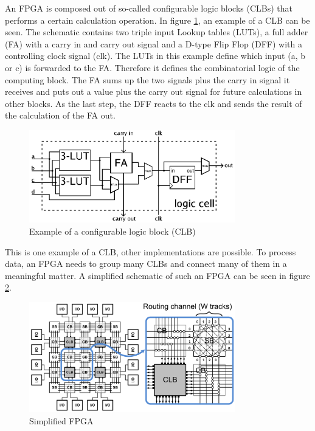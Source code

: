 An FPGA is composed out of so-called configurable logic blocks (CLBs)
that performs a certain calculation operation. In figure
\ref{fig:kallstrom_FPGA_cell_example}, an example of a CLB
can be seen. The schematic contains two triple input
Lookup tables (LUTs), a full adder (FA) with a carry in and
carry out signal and a D-type Flip Flop (DFF) 
with a controlling clock signal (clk). The LUTs in this
example define which input (a, b or c) is forwarded to the
FA. Therefore it defines the combinatorial logic of the
computing block.
The FA sums up the two signals plus the carry in signal
it receives and puts out a value plus the carry out signal
for future calculations in other blocks.
As the last step, the DFF reacts to
the clk and sends the result of the
calculation of the FA out.
\begin{figure}
    \centering
    \includegraphics[width=0.8\textwidth]{figures/kallstrom_FPGA_cell_example}
    \caption{Example of a configurable logic block (CLB) \cite{kallstrom_fpga_cell_example}}
    \label{fig:kallstrom_FPGA_cell_example}
\end{figure}
This is one example of a CLB, other implementations
are possible.
To process data, an FPGA needs to group
many CLBs and connect many of them in a meaningful matter.
A simplified schematic of such an FPGA can be seen in
figure \ref{fig:qin_fpga_simplified}.
\begin{figure}
    \centering
    \includegraphics[width=0.8\textwidth]{figures/qin_FPGA_simplified}
    \caption{Simplified FPGA \cite[p.~6]{qin_fpga}}
    \label{fig:qin_fpga_simplified}
\end{figure}
